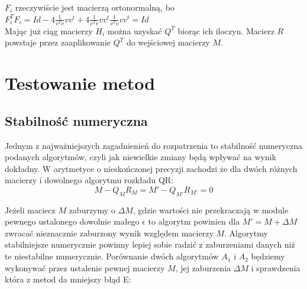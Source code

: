 \documentclass[11pt,wide]{mwart}
\begin{document}
$F_i$ rzeczywiście jest macierzą ortonormalną, bo $F_i^TF_i= Id - 4\frac{1}{v^Tv}vv^t+4\frac{1}{v^Tv}vv^t\frac{1}{v^Tv}vv^t=Id$
\\ Mając już ciąg macierzy $H_i$ można uzyskać $Q^T$ biorąc ich iloczyn. Macierz $R$ powstaje przez zaaplikowanie $Q^T$ do wejściowej macierzy $M$.

\section{Testowanie metod}
\subsection{Stabilność numeryczna}

Jednym z najważniejszych zagadnienień do rozpatrzenia to stabilność numeryczna podanych algorytmów, czyli jak niewielkie zmiany będą wpływać na wynik dokładny. W arytmetyce o nieskończonej precyzji zachodzi że dla dwóch różnych macierzy i dowolnego algorytmu rozkładu QR: 
\begin{equation}
M - Q_MR_M = M' - Q_{M'}R_{M'} = 0
\end{equation}

Jeżeli maciecz $M$ zaburzymy o $\Delta M$, gdzie wartości nie przekraczają w module pewnego ustalonego dowolnie małego $\epsilon$ to algorytm powinien dla $M' = M + \Delta M$ zwracać nieznacznie zaburzony wynik względem macierzy $M$. Algorytmy stabilniejsze numerycznie powinny lepiej sobie radzić z zaburzeniami danych niż te niestabilne numerycznie. Porównanie dwóch algorytmów $A_1$ i $A_2$ będziemy wykonywać przez ustalenie pewnej macierzy $M$, jej zaburzenia $\Delta M$ i sprawdzenia która z metod da mniejszy błąd E:
\end{document}
